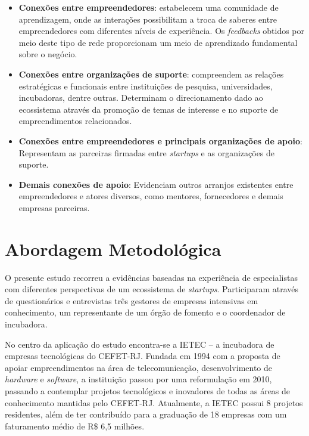 \documentclass{sig-alternate-05-2015}
\begin{document}
\begin{itemize}
	\item \textbf{Conexões entre empreendedores}: estabelecem uma comunidade de aprendizagem, onde as interações possibilitam a troca de saberes entre empreendedores com diferentes níveis de experiência. Os \textit{feedbacks} obtidos por meio deste tipo de rede proporcionam um  meio de aprendizado fundamental sobre o negócio.
	\item \textbf{Conexões entre organizações de suporte}: compreendem as relações estratégicas e funcionais entre instituições de pesquisa, universidades, incubadoras, dentre outras. Determinam o direcionamento dado ao ecossistema através da promoção de temas de interesse e no suporte de empreendimentos relacionados.
	\item \textbf{Conexões entre empreendedores e principais organizações de apoio}: Representam as parceiras firmadas entre \textit{startups} e as organizações de suporte. 
	\item \textbf{Demais conexões de apoio}: Evidenciam outros arranjos existentes entre empreendedores e atores diversos, como mentores, fornecedores e demais empresas parceiras.

\end{itemize}

\section{Abordagem Metodológica}
O presente estudo recorreu a evidências baseadas na experiência de especialistas com diferentes perspectivas de um ecossistema de \textit{startups}. Participaram através de questionários e entrevistas três gestores de empresas intensivas em conhecimento, um representante de um órgão de fomento e o coordenador de incubadora. 

No centro da aplicação do estudo encontra-se a IETEC -- a incubadora de empresas tecnológicas do CEFET-RJ. Fundada em 1994 com a proposta de apoiar empreendimentos na área de telecomunicação, desenvolvimento de \textit{hardware} e \textit{software}, a instituição passou por uma reformulação em 2010, passando a contemplar projetos tecnológicos e inovadores de todas as áreas de conhecimento mantidas pelo CEFET-RJ. Atualmente, a IETEC possui 8 projetos residentes, além de ter contribuído para a graduação de 18 empresas com um faturamento médio de R\$ 6,5 milhões. 
\end{document}
